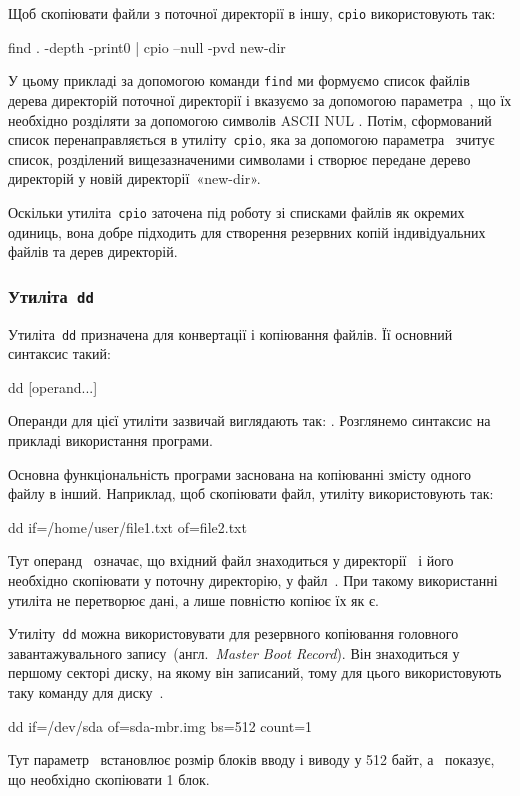 \documentclass[
	a4paper,
	oneside,
	BCOR = 10mm,
	DIV = 12,
	12pt,
	headings = normal,
]{scrartcl}
\newcommand{\allcaps}[1]{%
	{%
		\addfontfeatures{%
			Letters = UppercaseSmallCaps,
			LetterSpace = 8,%
		}%
		#1%
	}%
}
\newcommand{\progname}[1]{\texttt{#1}}
\newcommand{\commandname}[1]{\texttt{#1}}
\newcommand{\transeng}[1]{{англ.}~\textit{\textenglish{#1}}}
\begin{document}
				Щоб скопіювати файли з поточної директорії в іншу, \textenglish{\progname{cpio}} використовують так:
				\begin{bashterm}
					find . -depth -print0 | cpio --null -pvd new-dir
				\end{bashterm}
				У цьому прикладі за допомогою команди \commandname{find} ми формуємо список файлів дерева директорій поточної директорії і вказуємо за допомогою параметра~, що їх необхідно розділяти за допомогою символів \textenglish{\allcaps{ASCII NUL}}. Потім, сформований список перенаправляється в утиліту~\progname{cpio}, яка за допомогою параметра~ зчитує список, розділений вищезазначеними символами і створює передане дерево директорій у новій директорії~«\textenglish{new-dir}».

				Оскільки утиліта~\progname{cpio} заточена під роботу зі списками файлів як окремих одиниць, вона добре підходить для створення резервних копій індивідуальних файлів та дерев директорій.

			\subsubsection{Утиліта~\textenglish{\progname{dd}}}
				Утиліта~\progname{dd} призначена для конвертації і копіювання файлів. Її основний синтаксис такий:
				\begin{bashterm}
					dd [operand...]
				\end{bashterm}
				Операнди для цієї утиліти зазвичай виглядають так: . Розглянемо синтаксис на прикладі використання програми.

				Основна функціональність програми заснована на копіюванні змісту одного файлу в інший. Наприклад, щоб скопіювати файл, утиліту використовують так:
				\begin{bashterm}
					dd if=/home/user/file1.txt of=file2.txt
				\end{bashterm}
				Тут операнд~ означає, що вхідний файл знаходиться у директорії~ і його необхідно скопіювати у поточну директорію, у файл~. При такому використанні утиліта не перетворює дані, а лише повністю копіює їх як є.

				Утиліту~\progname{dd} можна використовувати для резервного копіювання головного завантажувального запису~(\transeng{Master Boot Record}). Він знаходиться у першому секторі диску, на якому він записаний, тому для цього використовують таку команду для диску~.
				\begin{bashterm}
					dd if=/dev/sda of=sda-mbr.img bs=512 count=1
				\end{bashterm}
				Тут параметр~ встановлює розмір блоків вводу і виводу у 512 байт, а~ показує, що необхідно скопіювати 1 блок.
\end{document}
